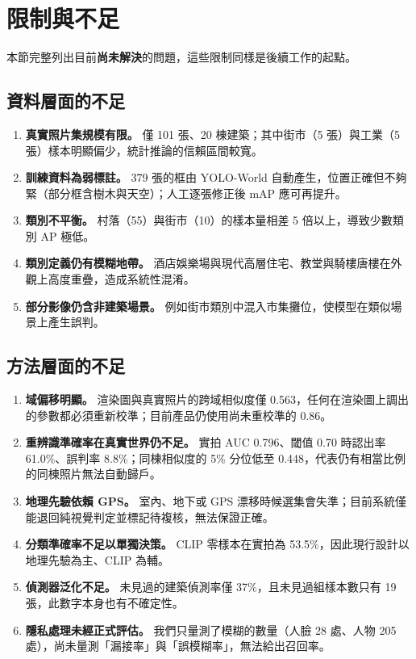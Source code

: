 \documentclass[11pt,a4paper,fontset=windows]{ctexart}
\begin{document}
\section{限制與不足}
本節完整列出目前\textbf{尚未解決}的問題，這些限制同樣是後續工作的起點。

\subsection{資料層面的不足}
\begin{enumerate}[leftmargin=1.4em,itemsep=2pt]
  \item \textbf{真實照片集規模有限。} 僅 101 張、20 棟建築；其中街市（5 張）與工業（5 張）樣本明顯偏少，統計推論的信賴區間較寬。
  \item \textbf{訓練資料為弱標註。} 379 張的框由 YOLO-World 自動產生，位置正確但不夠緊（部分框含樹木與天空）；人工逐張修正後 mAP 應可再提升。
  \item \textbf{類別不平衡。} 村落（55）與街市（10）的樣本量相差 5 倍以上，導致少數類別 AP 極低。
  \item \textbf{類別定義仍有模糊地帶。} 酒店娛樂場與現代高層住宅、教堂與騎樓唐樓在外觀上高度重疊，造成系統性混淆。
  \item \textbf{部分影像仍含非建築場景。} 例如街市類別中混入市集攤位，使模型在類似場景上產生誤判。
\end{enumerate}

\subsection{方法層面的不足}
\begin{enumerate}[leftmargin=1.4em,itemsep=2pt]
  \item \textbf{域偏移明顯。} 渲染圖與真實照片的跨域相似度僅 0.563，任何在渲染圖上調出的參數都必須重新校準；目前產品仍使用尚未重校準的 0.86。
  \item \textbf{重辨識準確率在真實世界仍不足。} 實拍 AUC 0.796、閾值 0.70 時認出率 61.0\%、誤判率 8.8\%；同棟相似度的 5\% 分位低至 0.448，代表仍有相當比例的同棟照片無法自動歸戶。
  \item \textbf{地理先驗依賴 GPS。} 室內、地下或 GPS 漂移時候選集會失準；目前系統僅能退回純視覺判定並標記待複核，無法保證正確。
  \item \textbf{分類準確率不足以單獨決策。} CLIP 零樣本在實拍為 53.5\%，因此現行設計以地理先驗為主、CLIP 為輔。
  \item \textbf{偵測器泛化不足。} 未見過的建築偵測率僅 37\%，且未見過組樣本數只有 19 張，此數字本身也有不確定性。
  \item \textbf{隱私處理未經正式評估。} 我們只量測了模糊的數量（人臉 28 處、人物 205 處），尚未量測「漏接率」與「誤模糊率」，無法給出召回率。
\end{enumerate}
\end{document}
